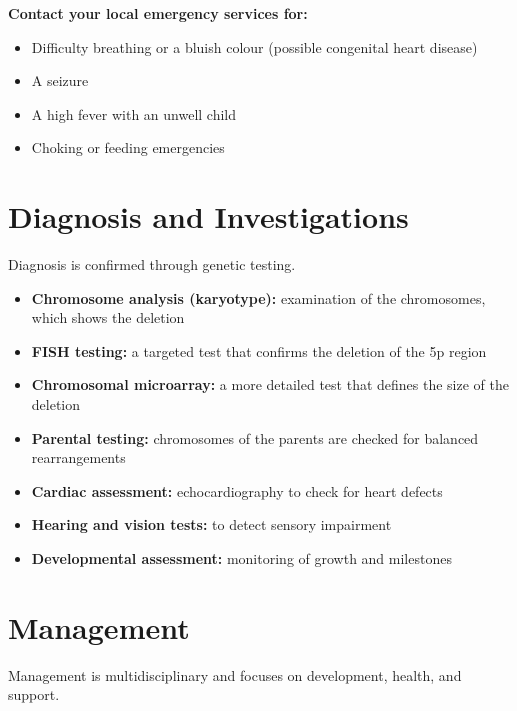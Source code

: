 \textbf{Contact your local emergency services for:}
\begin{itemize}
    \item Difficulty breathing or a bluish colour (possible congenital heart disease)
    \item A seizure
    \item A high fever with an unwell child
    \item Choking or feeding emergencies
\end{itemize}

\section*{Diagnosis and Investigations}
Diagnosis is confirmed through genetic testing.

\begin{itemize}
    \item \textbf{Chromosome analysis (karyotype):} examination of the chromosomes, which shows the deletion
    \item \textbf{FISH testing:} a targeted test that confirms the deletion of the 5p region
    \item \textbf{Chromosomal microarray:} a more detailed test that defines the size of the deletion
    \item \textbf{Parental testing:} chromosomes of the parents are checked for balanced rearrangements
    \item \textbf{Cardiac assessment:} echocardiography to check for heart defects
    \item \textbf{Hearing and vision tests:} to detect sensory impairment
    \item \textbf{Developmental assessment:} monitoring of growth and milestones
\end{itemize}

\section*{Management}
Management is multidisciplinary and focuses on development, health, and support.

